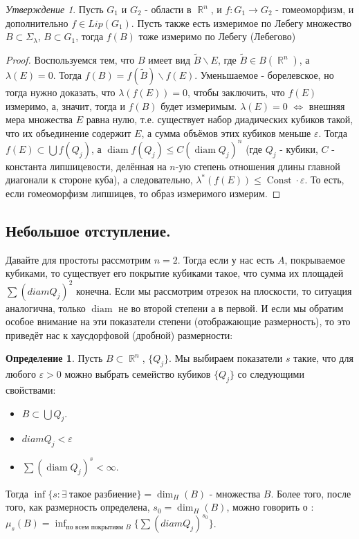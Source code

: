 \documentclass[a4paper]{article}
\theoremstyle{indented}
\theoremstyle{definition}
\newtheorem{defn}{Определение}
\theoremstyle{remark}
\newtheorem{stat}{Утверждение}
\DeclareMathOperator{\ra}{\rightarrow}
\DeclareMathOperator{\RR}{\mathbb{R}}
\DeclareMathOperator{\diam}{diam}
\DeclareMathOperator{\Const}{Const}
\begin{document}
 
 
\begin{stat}
Пусть $G_1$ и $G_2$ - области в $\RR^n$, и $f: G_1 \ra G_2$ - гомеоморфизм, и дополнительно $f \in Lip(G_1)$. Пусть также есть измеримое по Лебегу множество $B \subset \Sigma_\lambda$, $B\subset G_1$, тогда $f(B)$ тоже измеримо по Лебегу (Лебегово)
\end{stat}
 
\begin{proof}
Воспользуемся тем, что $B$ имеет вид $\tilde{B} \backslash E$, где $\tilde{B} \in B(\RR^n)$, а  $\lambda(E)=0$. Тогда $f(B) = f(\tilde{B}) \backslash f(E)$. Уменьшаемое - борелевское, но тогда нужно доказать, что $\lambda(f(E)) = 0$, чтобы заключить, что $f(E)$ измеримо, а, значит, тогда и $f(B)$ будет измеримым. $\lambda(E) = 0$ $\iff $ внешняя мера множества $E$ равна нулю, т.е. существует набор диадических кубиков такой, что их объединение содержит $E$, а сумма объёмов этих кубиков меньше $\varepsilon$. Тогда $f(E) \subset \bigcup f(Q_j)$, а $\diam f(Q_j) \leq C(\diam Q_j)^n$ (где $Q_j$ - кубики, $C$ - константа липшицевости, делённая на $n$-ую степень отношения длины главной диагонали к стороне куба), а следовательно, $\lambda^*(f(E))\leq \Const \cdot \varepsilon$. То есть, если гомеоморфизм липшицев, то образ измеримого измерим.
\end{proof}
 
\subsection{Небольшое отступление.}
 
Давайте для простоты рассмотрим $n=2$. Тогда если у нас есть $A$, покрываемое кубиками, то существует его покрытие кубиками такое, что сумма их площадей $\sum (diam Q_j)^2$ конечна. Если мы рассмотрим отрезок на плоскости, то ситуация аналогична, только $\diam$ не во второй степени а в первой. И если мы обратим особое внимание на эти показатели степени (отображающие размерность), то это приведёт нас к хаусдорфовой (дробной) размерности:  
 
\begin{defn}
Пусть $B \subset \RR^n$, $\{Q_j\}$. Мы выбираем показатели $s$ такие, что для любого $\varepsilon > 0$ можно выбрать семейство кубиков $\{Q_j\}$ со следующими свойствами:
 
\begin{itemize}
\item $B \subset \bigcup Q_j$.
\item $diam Q_j < \varepsilon$
\item $\sum (\diam Q_j)^s < \infty$.
\end{itemize}
 
Тогда $\inf\{s : \exists \:\text{такое разбиение}\} = \dim_H(B)$ -  множества $B$. Более того, после того, как размерность определена, $s_0 = \dim_H(B)$, можно говорить о : $\mu_s(B) = \inf_{\text{по всем покрытиям } B} \{ \sum (diam Q_j)^{s_0} \}$.
\end{defn}
 
\end{document}
